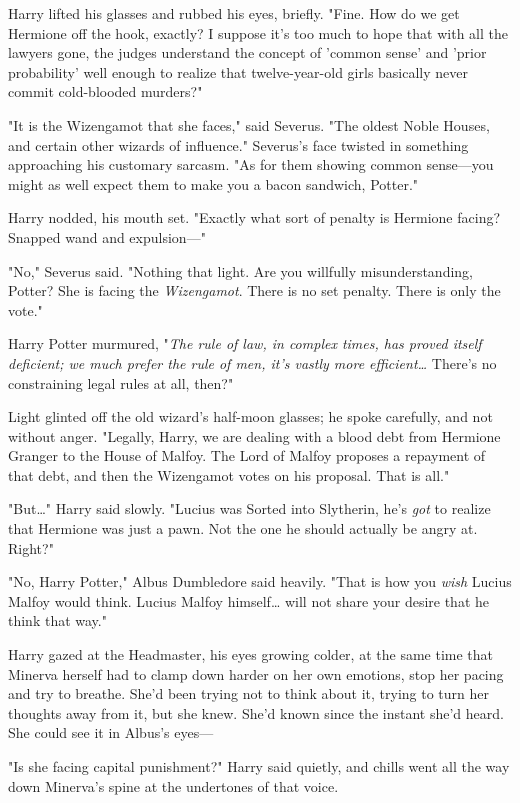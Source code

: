 Harry lifted his glasses and rubbed his eyes, briefly. "Fine. How do we get 
Hermione off the hook, exactly? I suppose it's too much to hope that with all 
the lawyers gone, the judges understand the concept of 'common sense' and 
'prior probability' well enough to realize that twelve-year-old girls basically 
never commit cold-blooded murders?"

"It is the Wizengamot that she faces," said Severus. "The oldest Noble Houses, 
and certain other wizards of influence." Severus's face twisted in something 
approaching his customary sarcasm. "As for them showing common sense---you 
might as well expect them to make you a bacon sandwich, Potter."

Harry nodded, his mouth set. "Exactly what sort of penalty is Hermione facing? 
Snapped wand and expulsion---"

"No," Severus said. "Nothing that light. Are you willfully misunderstanding, 
Potter? She is facing the \emph{Wizengamot}. There is no set penalty. There is 
only the vote."

Harry Potter murmured, "\emph{The rule of law, in complex times, has proved 
itself deficient; we much prefer the rule of men, it's vastly more 
efficient{\ldots}} There's no constraining legal rules at all, then?"

Light glinted off the old wizard's half-moon glasses; he spoke carefully, and 
not without anger. "Legally, Harry, we are dealing with a blood debt from 
Hermione Granger to the House of Malfoy. The Lord of Malfoy proposes a 
repayment of that debt, and then the Wizengamot votes on his proposal. That is 
all."

"But{\ldots}" Harry said slowly. "Lucius was Sorted into Slytherin, he's 
\emph{got} to realize that Hermione was just a pawn. Not the one he should 
actually be angry at. Right?"

"No, Harry Potter," Albus Dumbledore said heavily. "That is how you \emph{wish} 
Lucius Malfoy would think. Lucius Malfoy himself{\ldots} will not share your 
desire that he think that way."

Harry gazed at the Headmaster, his eyes growing colder, at the same time that 
Minerva herself had to clamp down harder on her own emotions, stop her pacing 
and try to breathe. She'd been trying not to think about it, trying to turn her 
thoughts away from it, but she knew. She'd known since the instant she'd heard. 
She could see it in Albus's eyes---

"Is she facing capital punishment?" Harry said quietly, and chills went all the 
way down Minerva's spine at the undertones of that voice.

